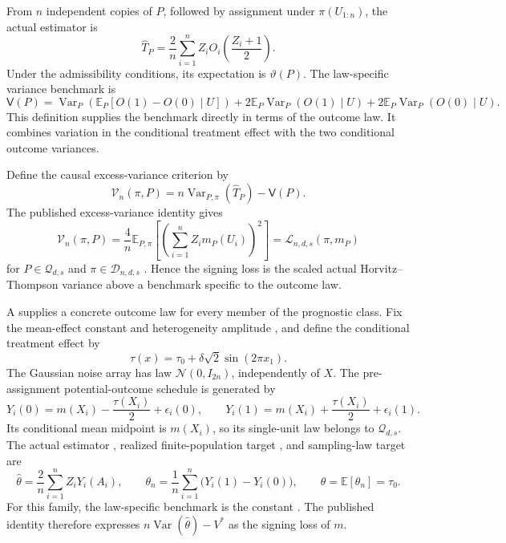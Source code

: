 From \(n\) independent copies of \(P\), followed by assignment under \(\pi(U_{1:n})\), the actual estimator is
\[
\widehat T_P
=
\frac2n\sum_{i=1}^n Z_i
O_i\!\left(\frac{Z_i+1}{2}\right).
\]
Under the admissibility conditions, its expectation is \(\vartheta(P)\). The law-specific variance benchmark is
\[
\mathsf V(P)
=
\operatorname{Var}_P\!\left(
\mathbb E_P[O(1)-O(0)\mid U]
\right)
+
2\mathbb E_P\operatorname{Var}_P(O(1)\mid U)
+
2\mathbb E_P\operatorname{Var}_P(O(0)\mid U).
\]
This definition supplies the benchmark directly in terms of the outcome law. It combines variation in the conditional treatment effect with the two conditional outcome variances.

Define the causal excess-variance criterion by
\[
\mathcal V_n(\pi,P)
=
n\operatorname{Var}_{P,\pi}(\widehat T_P)-\mathsf V(P).
\]
The published excess-variance identity gives
\[
\mathcal V_n(\pi,P)
=
\frac4n\mathbb E_{P,\pi}
\left[
\left(\sum_{i=1}^n Z_i m_P(U_i)\right)^2
\right]
=
\mathcal L_{n,d,s}(\pi,m_P)
\]
for \(P\in\mathcal Q_{d,s}\) and \(\pi\in\mathcal D_{n,d,s}\)
\citep[Proposition 2.3, equation (2.4), under Assumption 2.1 and Definition 2.2]{Cytrynbaum2026Limits}.
Hence the signing loss is the scaled actual Horvitz--Thompson variance above a benchmark specific to the outcome law.

A  supplies a concrete outcome law for every member of the prognostic class. Fix the mean-effect constant  and heterogeneity amplitude , and define the conditional treatment effect  by
\[
\tau(x)=\tau_0+\delta\sqrt2\sin(2\pi x_1).
\]
The Gaussian noise array  has law \(\mathcal N(0,I_{2n})\), independently of \(X\). The pre-assignment potential-outcome schedule  is generated by
\[
Y_i(0)=m(X_i)-\frac{\tau(X_i)}2+\epsilon_i(0),
\qquad
Y_i(1)=m(X_i)+\frac{\tau(X_i)}2+\epsilon_i(1).
\]
Its conditional mean midpoint is \(m(X_i)\), so its single-unit law belongs to \(\mathcal Q_{d,s}\). The actual estimator , realized finite-population target , and sampling-law target  are
\[
\widehat\theta
=
\frac2n\sum_{i=1}^n Z_iY_i(A_i),
\qquad
\theta_n
=
\frac1n\sum_{i=1}^n\bigl(Y_i(1)-Y_i(0)\bigr),
\qquad
\theta=\mathbb E[\theta_n]=\tau_0.
\]
For this family, the law-specific benchmark is the constant . The published identity therefore expresses \(n\operatorname{Var}(\widehat\theta)-V^*\) as the signing loss of \(m\).

